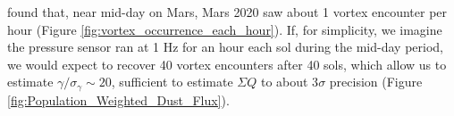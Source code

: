 \citet{Jackson2022} found that, near mid-day on Mars, Mars 2020 saw about 1 vortex encounter per hour (Figure \ref{fig:vortex_occurrence_each_hour}). If, for simplicity, we imagine the pressure sensor ran at 1 Hz for an hour each sol during the mid-day period, we would expect to recover 40 vortex encounters after 40 sols, which allow us to estimate $\gamma/\sigma_\gamma \sim 20$, sufficient to estimate $\Sigma Q$ to about 3$\sigma$ precision (Figure \ref{fig:Population_Weighted_Dust_Flux}).